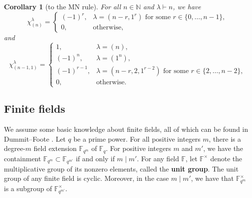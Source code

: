 \documentclass[10pt]{article}
\newtheorem{corollary}[theorem]{Corollary}
\theoremstyle{definition}
\newcommand{\F}{\mathbb{F}}
\newcommand{\N}{\mathbb{N}}
\newcommand{\myemph}{\textbf}
\begin{document}
\begin{samepage}
\begin{corollary}[to the MN rule] \label{MNrule_ncycle}
For all \(n \in \N\) and \(\lambda \vdash n\), we have
\begin{equation}
\chi^\lambda_{(n)} =
\begin{cases}
(-1)^r, & \lambda = (n-r,1^r) \text{ for some } r \in \{0,\ldots,n-1\}, \\
0, & \text{otherwise},
\end{cases}
\end{equation}
and
\begin{equation}
\chi^\lambda_{(n-1,1)} = \begin{cases}
1,          & \lambda = (n), \\
(-1)^n,     & \lambda = (1^n), \\
(-1)^{r-1}, & \lambda = (n-r, 2, 1^{r-2}) \text{ for some } r \in \{2,\ldots,n-2\}, \\
0,          & \text{otherwise}.
\end{cases}
\end{equation}
\end{corollary}
\end{samepage}























\subsection{Finite fields}

We assume some basic knowledge about finite fields, all of which can be found in Dummit--Foote \cite{DF}.
Let \(q\) be a prime power.
For all positive integers \(m\), there is a degree-\(m\) field extension \(\F_{q^m}\) of \(\F_q\).
For positive integers \(m\) and \(m'\), we have the containment \(\F_{q^m} \subset \F_{q^{m'}}\) if and only if \(m \mid m'\).
For any field \(\F\), let \(\F^\times\) denote the multiplicative group of its nonzero elements, called the \myemph{unit group}.
The unit group of any finite field is cyclic.
Moreover, in the case \(m \mid m'\), we have that \(\F_{q^m}^\times\) is a subgroup of \(\F_{q^{m'}}^\times\).
\end{document}
